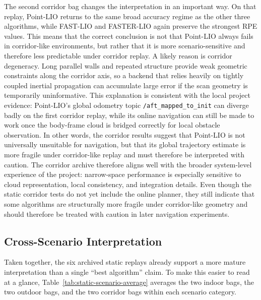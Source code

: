 \documentclass[12pt,a4paper]{report}
\begin{document}
The second corridor bag changes the interpretation in an important way. On that replay, Point-LIO returns to the same broad accuracy regime as the other three algorithms, while FAST-LIO and FASTER-LIO again preserve the strongest RPE values. This means that the correct conclusion is not that Point-LIO always fails in corridor-like environments, but rather that it is more scenario-sensitive and therefore less predictable under corridor replay. A likely reason is corridor degeneracy. Long parallel walls and repeated structure provide weak geometric constraints along the corridor axis, so a backend that relies heavily on tightly coupled inertial propagation can accumulate large error if the scan geometry is temporarily uninformative. This explanation is consistent with the local project evidence: Point-LIO's global odometry topic \texttt{/aft\_mapped\_to\_init} can diverge badly on the first corridor replay, while its online navigation can still be made to work once the body-frame cloud is bridged correctly for local obstacle observation. In other words, the corridor results suggest that Point-LIO is not universally unsuitable for navigation, but that its global trajectory estimate is more fragile under corridor-like replay and must therefore be interpreted with caution. The corridor archive therefore aligns well with the broader system-level experience of the project: narrow-space performance is especially sensitive to cloud representation, local consistency, and integration details. Even though the static corridor tests do not yet include the online planner, they still indicate that some algorithms are structurally more fragile under corridor-like geometry and should therefore be treated with caution in later navigation experiments.

\subsection{Cross-Scenario Interpretation}
Taken together, the six archived static replays already support a more mature interpretation than a single ``best algorithm'' claim. To make this easier to read at a glance, Table~\ref{tab:static-scenario-average} averages the two indoor bags, the two outdoor bags, and the two corridor bags within each scenario category.
\end{document}
